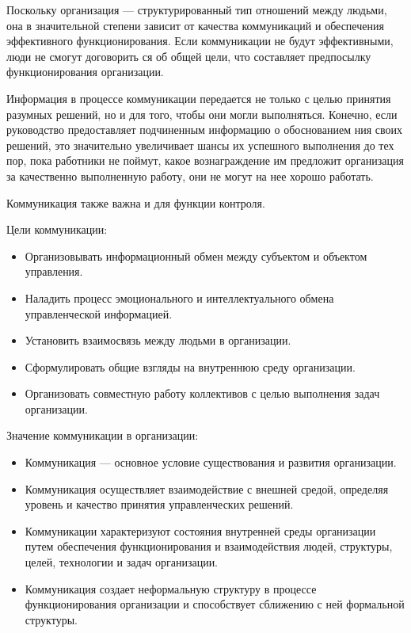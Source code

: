 \documentclass[a4paper,12pt,oneside,final]{extarticle}
\numberwithin{equation}{section}
\begin{document}
Поскольку организация --- структурированный тип отношений между людьми, она в значительной степени зависит от качества коммуникаций и обеспечения эффективного функционирования.
Если коммуникации не будут эффективными, люди не смогут договорить ся об общей цели, что составляет предпосылку функционирования организации.

Информация в процессе коммуникации передается не только с целью принятия разумных решений, но и для того, чтобы они могли выполняться.
Конечно, если руководство предоставляет подчиненным информацию о обоснованием ния своих решений, это значительно увеличивает шансы их успешного выполнения до тех пор, пока работники не поймут, какое вознаграждение им предложит организация за качественно выполненную работу, они не могут на нее хорошо работать.

Коммуникация также важна и для функции контроля.

Цели коммуникации:
\begin{itemize}
	\item Организовывать информационный обмен между субъектом и объектом управления.
	\item Наладить процесс эмоционального и интеллектуального обмена управленческой информацией.
	\item Установить взаимосвязь между людьми в организации.
	\item Сформулировать общие взгляды на внутреннюю среду организации.
	\item Организовать совместную работу коллективов с целью выполнения задач организации.
\end{itemize}
Значение коммуникации в организации:
\begin{itemize}
	\item Коммуникация --- основное условие существования и развития организации.
	\item Коммуникация осуществляет взаимодействие с внешней средой, определяя уровень и качество принятия управленческих решений.
	\item Коммуникации характеризуют состояния внутренней среды организации путем обеспечения функционирования и взаимодействия людей, структуры, целей, технологии и задач организации.
	\item Коммуникация создает неформальную структуру в процессе функционирования организации и способствует сближению с ней формальной структуры.
\end{itemize}
\end{document}
